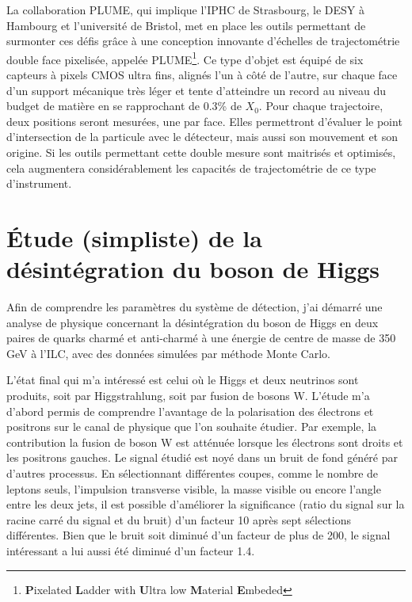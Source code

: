 \documentclass[a4papper, 10pt]{article}
\begin{document}
  La collaboration PLUME, qui implique l'IPHC de Strasbourg, le DESY à Hambourg et l'université de Bristol, met en place les outils permettant de surmonter ces défis grâce à une conception innovante d'échelles de trajectométrie double face pixelisée, appelée PLUME\footnote{\textbf{P}ixelated \textbf{L}adder with \textbf{U}ltra low \textbf{M}aterial \textbf{E}mbeded}. 
  Ce type d'objet est équipé de six capteurs à pixels CMOS ultra fins, alignés l'un à côté de l'autre, sur chaque face d'un support mécanique très léger et tente d'atteindre un record au niveau du budget de matière en se rapprochant de 0.3\% de $X_0$.
  Pour chaque trajectoire, deux positions seront mesurées, une par face. 
  Elles permettront d'évaluer le point d'intersection de la particule avec le détecteur, mais aussi son mouvement et son origine. 
  Si les outils permettant cette double mesure sont maitrisés et optimisés, cela augmentera considérablement les capacités de trajectométrie de ce type d'instrument.

  \section{Étude (simpliste) de la désintégration du boson de Higgs}

  Afin de comprendre les paramètres du système de détection, j'ai démarré une analyse de physique concernant la désintégration du boson de Higgs en deux paires de quarks charmé et anti-charmé à une énergie de centre de masse de 350 GeV à l'ILC, avec des données simulées par méthode Monte Carlo.

  L'état final qui m'a intéressé est celui où le Higgs et deux neutrinos sont produits, soit par Higgstrahlung, soit par fusion de bosons W.
  L'étude m'a d'abord permis de comprendre l'avantage de la polarisation des électrons et positrons sur le canal de physique que l'on souhaite étudier.
  Par exemple, la contribution la fusion de boson W est atténuée lorsque les électrons sont droits et les positrons gauches.
  Le signal étudié est noyé dans un bruit de fond généré par d'autres processus. 
  En sélectionnant différentes coupes, comme le nombre de leptons seuls, l'impulsion transverse visible, la masse visible ou encore l'angle entre les deux jets, il est possible d'améliorer la significance (ratio du signal sur la racine carré du signal et du bruit) d'un facteur 10 après sept sélections différentes. 
  Bien que le bruit soit diminué d'un facteur de plus de 200, le signal intéressant a lui aussi été diminué d'un facteur 1.4.
\end{document}
